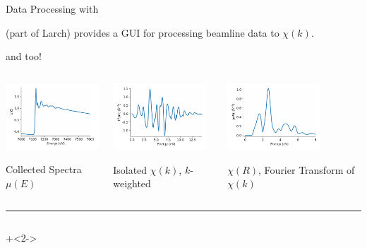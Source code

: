 \begin{slide}{Data Processing with {\xasviewer}  }

  \begin{cenpage}{135mm}
  {\xasviewer} (part of Larch) provides a GUI for
  processing beamline data to $\chi(k)$.

  \vmm
  {\athena} and {\sixpack} too!
    
  \begin{columns}
    \begin{column}{45mm}
      
      \includegraphics[width=35mm]{figs/experiment/feo_mu}

      \vmm
      Collected Spectra $\mu(E)$
      
    \end{column}
    \begin{column}{45mm}
      \includegraphics[width=35mm]{figs/experiment/feo_chik}

      \vmm
      Isolated $\chi(k)$, $k$-weighted 
      
    \end{column}
    \begin{column}{45mm}
      \includegraphics[width=35mm]{figs/experiment/feo_chir} 

      \vmm
      $\chi(R)$, Fourier Transform of $\chi(k)$ 
      
    \end{column}
  \end{columns}

  \vmm \hrule

  \vmm\vmm

{\small{
  \begin{columns}[T]
    \begin{column}{65mm}
      \onslide+<2->


\end{column}
\end{columns}}}
\end{cenpage}
\end{slide}
